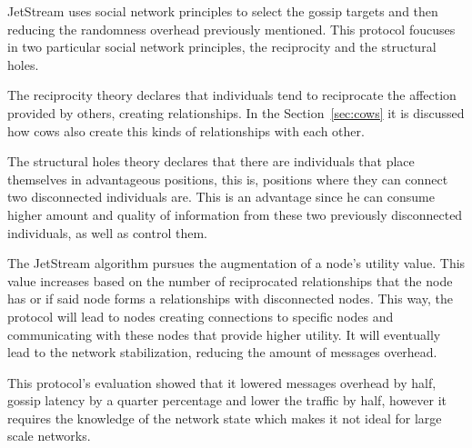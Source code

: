 JetStream \cite{Patel2006} uses social network principles to select the gossip targets and
then reducing the randomness overhead previously mentioned. This protocol foucuses in two
particular social network principles, the reciprocity and the structural holes.

The reciprocity theory declares that individuals tend to reciprocate the affection provided by
others, creating relationships. In the Section~\ref{sec:cows} it is discussed how cows also
create this kinds of relationships with each other.

The structural holes theory declares that there are individuals that place themselves in
advantageous positions, this is, positions where they can connect two disconnected individuals
are. This is an advantage since he can consume higher amount and quality of information from
these two previously disconnected individuals, as well as control them.

The JetStream algorithm  pursues the augmentation of a node's utility value. This value increases
based on the number of reciprocated relationships that the node has or if said node forms a
relationships with disconnected nodes. This way, the protocol will lead to nodes creating
connections to specific nodes and communicating with these nodes that provide higher utility.
It will eventually lead to the network stabilization, reducing the amount of messages overhead.

This protocol's evaluation \cite{Patel2006} showed that it lowered messages overhead by half,
gossip latency by a quarter percentage and lower the traffic by half, however it requires the
knowledge of the network state which makes it not ideal for large scale networks.





